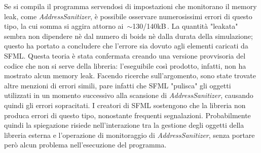 \documentclass{article}
\begin{document}
\begin{itemize}
    \smallskip
    Se si compila il programma servendosi di impostazioni che monitorano il 
    memory leak, come \textit{AddressSanitizer}, è possibile osservare 
    numerosissimi errori di questo tipo, la cui somma si aggira attorno ai 
    \,$\sim$130/140kB\,. La quantità "leakata" sembra non dipendere nè dal 
    numero di boids nè dalla durata della simulazione; questo ha portato a 
    concludere che l'errore sia dovuto agli elementi caricati da SFML. Questa 
    teoria è stata confermata creando una versione provvisoria del codice che 
    non si serve della libreria: l'eseguibile così prodotto, infatti, non ha 
    mostrato alcun memory leak.
    Facendo ricerche sull'argomento, sono state trovate altre menzioni di 
    errori simili, pare infatti che SFML "pulisca" gli oggetti utilizzati in un
    momento successivo alla scansione di \textit{AddressSanitizer}, causando 
    quindi gli errori sopracitati. I creatori di SFML sostengono che la 
    libreria non produca errori di questo tipo, nonostante frequenti 
    segnalazioni. Probabilmente quindi la spiegazione risiede nell'interazione 
    tra la gestione degli oggetti della libreria esterna e l'operazione di 
    monitoraggio di \textit{AddressSanitizer}, senza portare però alcun 
    problema nell'esecuzione del programma.
    

\end{itemize}
         
\end{document}
